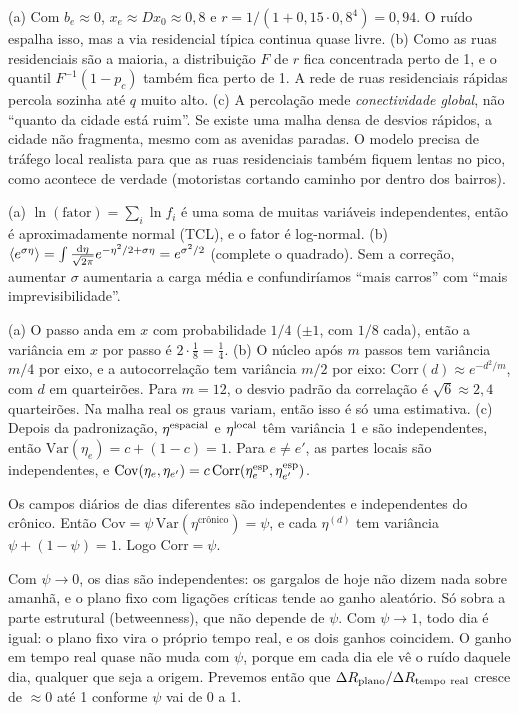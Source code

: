 \documentclass[11pt]{article}
\begin{document}
(a) Com $b_e\approx0$, $x_e\approx Dx_0\approx0{,}8$ e $r = 1/(1+0{,}15\cdot0{,}8^4) = 0{,}94$. O ruído espalha isso, mas a via residencial típica continua quase livre. (b) Como as ruas residenciais são a maioria, a distribuição $F$ de $r$ fica concentrada perto de 1, e o quantil $F^{-1}(1-p_c)$ também fica perto de 1. A rede de ruas residenciais rápidas percola sozinha até $q$ muito alto. (c) A percolação mede \emph{conectividade global}, não ``quanto da cidade está ruim''. Se existe uma malha densa de desvios rápidos, a cidade não fragmenta, mesmo com as avenidas paradas. O modelo precisa de tráfego local realista para que as ruas residenciais também fiquem lentas no pico, como acontece de verdade (motoristas cortando caminho por dentro dos bairros).

(a) $\ln(\text{fator}) = \sum_i\ln f_i$ é uma soma de muitas variáveis independentes, então é aproximadamente normal (TCL), e o fator é log-normal. (b) $\left\langle e^{\sigma\eta} \right\rangle = \int\frac{\mathrm{d}\eta}{\sqrt{2\pi}}e^{-\eta^2/2+\sigma\eta} = e^{\sigma^2/2}$ (complete o quadrado). Sem a correção, aumentar $\sigma$ aumentaria a carga média e confundiríamos ``mais carros'' com ``mais imprevisibilidade''.

(a) O passo anda em $x$ com probabilidade $1/4$ ($\pm1$, com $1/8$ cada), então a variância em $x$ por passo é $2\cdot\tfrac18 = \tfrac14$. (b) O núcleo após $m$ passos tem variância $m/4$ por eixo, e a autocorrelação tem variância $m/2$ por eixo: $\mathrm{Corr}(d)\approx e^{-d^2/m}$, com $d$ em quarteirões. Para $m=12$, o desvio padrão da correlação é $\sqrt6\approx2{,}4$ quarteirões. Na malha real os graus variam, então isso é só uma estimativa. (c) Depois da padronização, $\eta^{\rm espacial}$ e $\eta^{\rm local}$ têm variância 1 e são independentes, então $\mathrm{Var}(\eta_e) = c+(1-c) = 1$. Para $e\ne e'$, as partes locais são independentes, e $\mathrm{Cov}(\eta_e,\eta_{e'}) = c\,\mathrm{Corr}(\eta^{\rm esp}_e,\eta^{\rm esp}_{e'})$.

Os campos diários de dias diferentes são independentes e independentes do crônico. Então $\mathrm{Cov} = \psi\,\mathrm{Var}(\eta^{\text{crônico}}) = \psi$, e cada $\eta^{(d)}$ tem variância $\psi+(1-\psi)=1$. Logo $\mathrm{Corr} = \psi$.

Com $\psi\to0$, os dias são independentes: os gargalos de hoje não dizem nada sobre amanhã, e o plano fixo com ligações críticas tende ao ganho aleatório. Só sobra a parte estrutural (betweenness), que não depende de $\psi$. Com $\psi\to1$, todo dia é igual: o plano fixo vira o próprio tempo real, e os dois ganhos coincidem. O ganho em tempo real quase não muda com $\psi$, porque em cada dia ele vê o ruído daquele dia, qualquer que seja a origem. Prevemos então que $\Delta R_{\rm plano}/\Delta R_{\rm tempo\ real}$ cresce de $\approx0$ até 1 conforme $\psi$ vai de 0 a 1.
\end{document}
